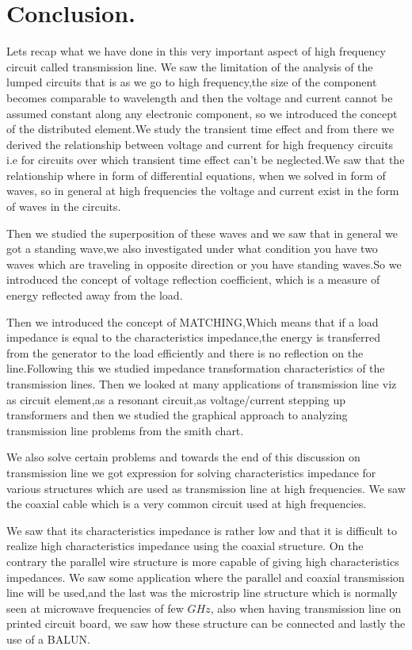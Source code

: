 \section{Conclusion.}
Lets recap what we have done in this very important aspect of high frequency circuit called transmission line. We saw the limitation of the analysis of the lumped circuits that is as we go to high frequency,the size of the component becomes comparable to wavelength and then the voltage and current cannot be assumed constant along any electronic component, so we introduced the concept of the distributed element.We study the transient time effect and from there we derived the relationship between voltage and current for high frequency circuits i.e for circuits over which transient time effect can't be neglected.We saw that the relationship where in form of differential equations, when we solved in form of waves, so in general at high frequencies the voltage and current exist in the form of waves in the circuits.

Then we studied the superposition of these waves and we saw that in general we got a standing wave,we also investigated under what condition you have two waves which are traveling in opposite direction or you have standing waves.So we introduced the concept of voltage reflection coefficient, which is a measure of energy reflected away  from the load.

Then we introduced the concept of MATCHING,Which means that if a load impedance is equal to the characteristics impedance,the energy is transferred from the generator to the load efficiently and there is no reflection on the line.Following this we studied impedance transformation characteristics of the  transmission lines. Then we looked at many applications of transmission line viz as circuit element,as a resonant circuit,as voltage/current stepping up transformers  and then we studied the graphical approach to analyzing  transmission line problems from the smith chart.

We also solve certain problems and towards the end of this discussion on transmission line we got expression for solving characteristics impedance for various structures which are used as transmission line at high frequencies. We saw the coaxial cable which is a very common circuit used at high frequencies.

We saw that its characteristics impedance is rather low and that it is difficult to realize high characteristics impedance using the coaxial structure. On the contrary the parallel wire structure is more capable of giving high characteristics impedances. We saw some application where the parallel and coaxial transmission line will be used,and the last was the microstrip line structure which is normally seen at microwave frequencies of few $GHz$, also when having transmission line on printed circuit board, we saw how these structure can be connected and lastly the use of a BALUN.

